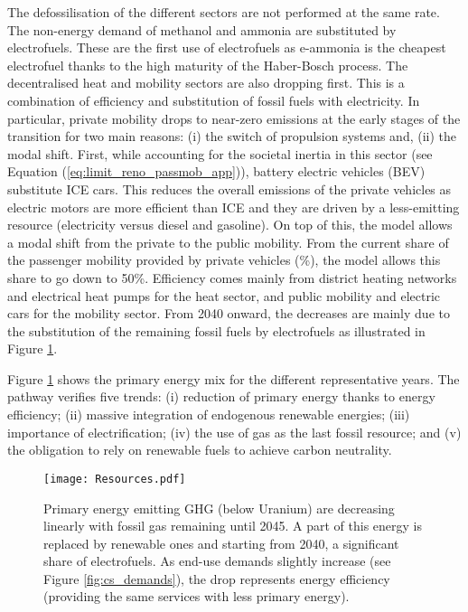 The defossilisation of the different sectors are not performed at the same rate. The non-energy demand of methanol and ammonia are substituted by electrofuels. These are the first use of electrofuels as  e-ammonia is the cheapest electrofuel thanks to the high maturity of the Haber-Bosch process. The decentralised heat and mobility sectors are also dropping first. This is a combination of efficiency and substitution of fossil fuels with electricity. In particular, private mobility drops to near-zero emissions at the early stages of the transition for two main reasons: (i) the switch of propulsion systems and, (ii) the modal shift. First, while accounting for the societal inertia in this sector (see Equation (\ref{eq:limit_reno_passmob_app})), battery electric vehicles (BEV) substitute \gls{ICE} cars. This reduces the overall emissions of the private vehicles as electric motors are more efficient than \gls{ICE} and they are driven by a less-emitting resource (\ie electricity versus diesel and gasoline). On top of this, the model allows a modal shift from the private to the public mobility. From the current share of the passenger mobility provided by private vehicles (\%), the model allows this share to go down to 50\%. Efficiency comes mainly from district heating networks and electrical heat pumps for the heat sector, and public mobility and electric cars for the mobility sector. From 2040 onward, the decreases are mainly due to the substitution of the remaining fossil fuels by electrofuels as illustrated in Figure \ref{fig:pestd_primary_energy}.

Figure \ref{fig:pestd_primary_energy} shows the primary energy mix for the different representative years. The pathway verifies five trends: (i) reduction of primary energy thanks to energy efficiency; (ii) massive integration of endogenous renewable energies; (iii) importance of electrification; (iv) the use of gas as the last fossil resource; and (v) the obligation to rely on renewable fuels to achieve carbon neutrality.

 \begin{figure}[!htbp]
\centering
\texttt{[image: Resources.pdf]}
\caption{Primary energy emitting \gls{GHG} (below Uranium) are decreasing linearly with fossil gas remaining until 2045. A part of this energy is replaced by renewable ones and starting from 2040, a significant share of electrofuels. As end-use demands slightly increase (see Figure \ref{fig:cs_demands}), the drop represents energy efficiency (\ie providing the same services with less primary energy).}
\label{fig:pestd_primary_energy}
\end{figure}

